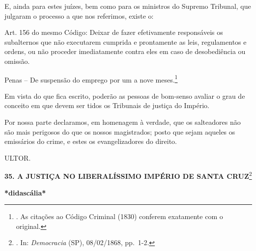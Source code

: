 E, ainda para estes juízes, bem como para os ministros do Supremo
Tribunal, que julgaram o processo a que nos referimos, existe o:

Art. 156 do mesmo Código: Deixar de fazer efetivamente responsáveis os
subalternos que não executarem cumprida e prontamente as leis,
regulamentos e ordens, ou não proceder imediatamente contra eles em caso
de desobediência ou omissão.

Penas -- De suspensão do emprego por um a nove meses.\footnote{. As
  citações ao Código Criminal (1830) conferem exatamente com o original.}

Em vista do que fica escrito, poderão as pessoas de bom-senso avaliar o
grau de conceito em que devem ser tidos os Tribunais de justiça do
Império.

Por nossa parte declaramos, em homenagem à verdade, que os salteadores
não são mais perigosos do que os nossos magistrados; posto que sejam
aqueles os emissários do crime, e estes os evangelizadores do direito.

ULTOR.

\textbf{35. A JUSTIÇA NO LIBERALÍSSIMO IMPÉRIO DE SANTA CRUZ}\footnote{.
  In: \emph{Democracia} (SP), 08/02/1868, pp.~1-2.}

\textbf{*didascália*}

